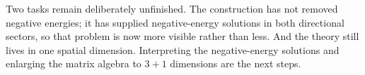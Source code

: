 \begin{classroomqa}
\end{classroomqa}

Two tasks remain deliberately unfinished. The construction has not removed negative energies; it has supplied negative-energy solutions in both directional sectors, so that problem is now more visible rather than less. And the theory still lives in one spatial dimension. Interpreting the negative-energy solutions and enlarging the matrix algebra to \(3+1\) dimensions are the next steps.
